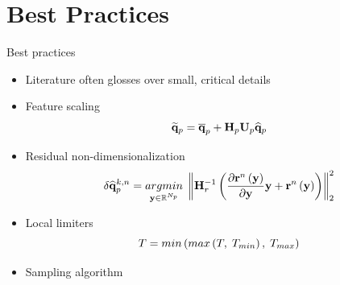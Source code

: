 \documentclass[]{beamer}
\begin{document}
\section*{Best Practices}

\begin{frame}{Best practices}
	\begin{itemize}
		\item Literature often glosses over small, critical details
		\item Feature scaling
		\begin{equation*}
			\primVecRom = \primVecCent + \primScale \primTrial \primVecCoef
		\end{equation*}
		\item Residual non-dimensionalization
		\begin{equation*}
			\delta \primVecCoef^{\newtonIdx, \timeIdx} = \argmin{\dummyVec \in \mathbb{R}^{\numPrimModes}} \norm{\resScaleInv \left(\pde{\resFuncIter{\timeIdx}{\dummyVec}}{\dummyVec} \dummyVec + \resFuncIter{\timeIdx}{\dummyVec}\right)}_2^2
		\end{equation*}
		\item Local limiters
		\begin{equation*}
			T = min\left(max\left(T, \; T_{min}\right), \; T_{max}\right)
		\end{equation*}
		\item Sampling algorithm
	\end{itemize}
\end{frame}
\end{document}

